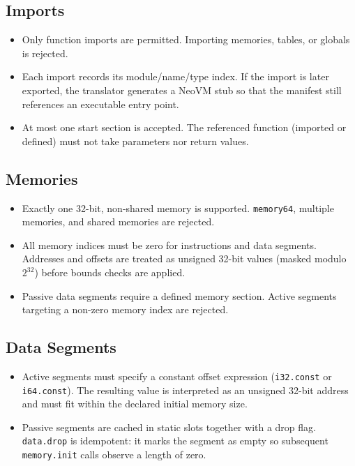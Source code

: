 \documentclass[11pt]{article}
\begin{document}
\subsection{Imports}
\begin{itemize}[nosep]
    \item Only function imports are permitted. Importing memories, tables, or globals is rejected.
    \item Each import records its module/name/type index. If the import is later exported, the translator generates a NeoVM stub so that the manifest still references an executable entry point.
    \item At most one start section is accepted. The referenced function (imported or defined) must not take parameters nor return values.
\end{itemize}

\subsection{Memories}
\begin{itemize}[nosep]
    \item Exactly one 32-bit, non-shared memory is supported. \texttt{memory64}, multiple memories, and shared memories are rejected.
    \item All memory indices must be zero for instructions and data segments. Addresses and offsets are treated as unsigned 32-bit values (masked modulo $2^{32}$) before bounds checks are applied.
    \item Passive data segments require a defined memory section. Active segments targeting a non-zero memory index are rejected.
\end{itemize}

\subsection{Data Segments}
\begin{itemize}[nosep]
    \item Active segments must specify a constant offset expression (\texttt{i32.const} or \texttt{i64.const}). The resulting value is interpreted as an unsigned 32-bit address and must fit within the declared initial memory size.
    \item Passive segments are cached in static slots together with a drop flag. \texttt{data.drop} is idempotent: it marks the segment as empty so subsequent \texttt{memory.init} calls observe a length of zero.
\end{itemize}
\end{document}
